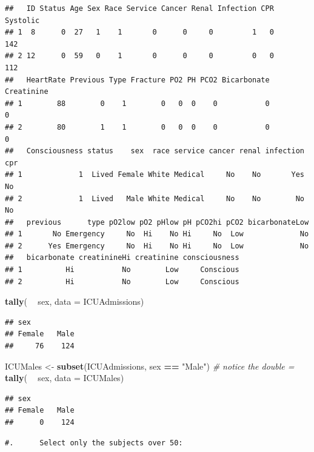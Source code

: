 \documentclass[]{book}
\newenvironment{Shaded}{\begin{snugshade}}{\end{snugshade}}
\newcommand{\CommentTok}[1]{\textcolor[rgb]{0.56,0.35,0.01}{\textit{#1}}}
\newcommand{\DataTypeTok}[1]{\textcolor[rgb]{0.13,0.29,0.53}{#1}}
\newcommand{\KeywordTok}[1]{\textcolor[rgb]{0.13,0.29,0.53}{\textbf{#1}}}
\newcommand{\NormalTok}[1]{#1}
\newcommand{\OperatorTok}[1]{\textcolor[rgb]{0.81,0.36,0.00}{\textbf{#1}}}
\newcommand{\StringTok}[1]{\textcolor[rgb]{0.31,0.60,0.02}{#1}}
\begin{document}
\begin{verbatim}
##   ID Status Age Sex Race Service Cancer Renal Infection CPR Systolic
## 1  8      0  27   1    1       0      0     0         1   0      142
## 2 12      0  59   0    1       0      0     0         0   0      112
##   HeartRate Previous Type Fracture PO2 PH PCO2 Bicarbonate Creatinine
## 1        88        0    1        0   0  0    0           0          0
## 2        80        1    1        0   0  0    0           0          0
##   Consciousness status    sex  race service cancer renal infection cpr
## 1             1  Lived Female White Medical     No    No       Yes  No
## 2             1  Lived   Male White Medical     No    No        No  No
##   previous      type pO2low pO2 pHlow pH pCO2hi pCO2 bicarbonateLow
## 1       No Emergency     No  Hi    No Hi     No  Low             No
## 2      Yes Emergency     No  Hi    No Hi     No  Low             No
##   bicarbonate creatinineHi creatinine consciousness
## 1          Hi           No        Low     Conscious
## 2          Hi           No        Low     Conscious
\end{verbatim}

\begin{Shaded}
\begin{Highlighting}[]
\KeywordTok{tally}\NormalTok{( }\OperatorTok{~}\StringTok{ }\NormalTok{sex, }\DataTypeTok{data =}\NormalTok{ ICUAdmissions) }
\end{Highlighting}
\end{Shaded}

\begin{verbatim}
## sex
## Female   Male 
##     76    124
\end{verbatim}

\begin{Shaded}
\begin{Highlighting}[]
\NormalTok{ICUMales <-}\StringTok{ }\KeywordTok{subset}\NormalTok{(ICUAdmissions, sex }\OperatorTok{==}\StringTok{ "Male"}\NormalTok{) }\CommentTok{# notice the double =}
\KeywordTok{tally}\NormalTok{( }\OperatorTok{~}\StringTok{ }\NormalTok{sex, }\DataTypeTok{data =}\NormalTok{ ICUMales)}
\end{Highlighting}
\end{Shaded}

\begin{verbatim}
## sex
## Female   Male 
##      0    124
\end{verbatim}

\begin{verbatim}
#.      Select only the subjects over 50:
\end{verbatim}
\end{document}
